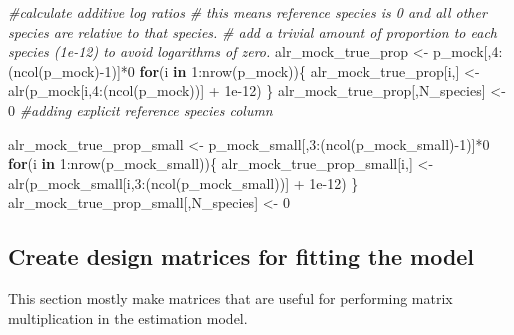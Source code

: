 \documentclass[
]{article}
\newenvironment{Shaded}{\begin{snugshade}}{\end{snugshade}}
\newcommand{\CommentTok}[1]{\textcolor[rgb]{0.56,0.35,0.01}{\textit{#1}}}
\newcommand{\ControlFlowTok}[1]{\textcolor[rgb]{0.13,0.29,0.53}{\textbf{#1}}}
\newcommand{\DecValTok}[1]{\textcolor[rgb]{0.00,0.00,0.81}{#1}}
\newcommand{\FloatTok}[1]{\textcolor[rgb]{0.00,0.00,0.81}{#1}}
\newcommand{\FunctionTok}[1]{\textcolor[rgb]{0.00,0.00,0.00}{#1}}
\newcommand{\NormalTok}[1]{#1}
\newcommand{\OtherTok}[1]{\textcolor[rgb]{0.56,0.35,0.01}{#1}}
\newcommand{\SpecialCharTok}[1]{\textcolor[rgb]{0.00,0.00,0.00}{#1}}
\begin{document}
\begin{Shaded}
\begin{Highlighting}[]
  \CommentTok{\#calculate additive log ratios}
  \CommentTok{\# this means reference species is 0 and all other species are relative to that species.}
  \CommentTok{\# add a trivial amount of proportion to each species (1e{-}12) to avoid logarithms of zero.}
\NormalTok{  alr\_mock\_true\_prop }\OtherTok{\textless{}{-}}\NormalTok{ p\_mock[,}\DecValTok{4}\SpecialCharTok{:}\NormalTok{(}\FunctionTok{ncol}\NormalTok{(p\_mock)}\SpecialCharTok{{-}}\DecValTok{1}\NormalTok{)]}\SpecialCharTok{*}\DecValTok{0}
  \ControlFlowTok{for}\NormalTok{(i }\ControlFlowTok{in} \DecValTok{1}\SpecialCharTok{:}\FunctionTok{nrow}\NormalTok{(p\_mock))\{}
\NormalTok{    alr\_mock\_true\_prop[i,] }\OtherTok{\textless{}{-}} \FunctionTok{alr}\NormalTok{(p\_mock[i,}\DecValTok{4}\SpecialCharTok{:}\NormalTok{(}\FunctionTok{ncol}\NormalTok{(p\_mock))] }\SpecialCharTok{+} \FloatTok{1e{-}12}\NormalTok{)}
\NormalTok{  \}}
\NormalTok{  alr\_mock\_true\_prop[,N\_species] }\OtherTok{\textless{}{-}} \DecValTok{0} \CommentTok{\#adding explicit reference species column}
  
\NormalTok{  alr\_mock\_true\_prop\_small }\OtherTok{\textless{}{-}}\NormalTok{ p\_mock\_small[,}\DecValTok{3}\SpecialCharTok{:}\NormalTok{(}\FunctionTok{ncol}\NormalTok{(p\_mock\_small)}\SpecialCharTok{{-}}\DecValTok{1}\NormalTok{)]}\SpecialCharTok{*}\DecValTok{0}
  \ControlFlowTok{for}\NormalTok{(i }\ControlFlowTok{in} \DecValTok{1}\SpecialCharTok{:}\FunctionTok{nrow}\NormalTok{(p\_mock\_small))\{}
\NormalTok{    alr\_mock\_true\_prop\_small[i,] }\OtherTok{\textless{}{-}} \FunctionTok{alr}\NormalTok{(p\_mock\_small[i,}\DecValTok{3}\SpecialCharTok{:}\NormalTok{(}\FunctionTok{ncol}\NormalTok{(p\_mock\_small))] }\SpecialCharTok{+} \FloatTok{1e{-}12}\NormalTok{)}
\NormalTok{  \}}
\NormalTok{  alr\_mock\_true\_prop\_small[,N\_species] }\OtherTok{\textless{}{-}} \DecValTok{0} 
\end{Highlighting}
\end{Shaded}

\hypertarget{create-design-matrices-for-fitting-the-model}{%
\subsection{Create design matrices for fitting the
model}\label{create-design-matrices-for-fitting-the-model}}

This section mostly make matrices that are useful for performing matrix
multiplication in the estimation model.
\end{document}
